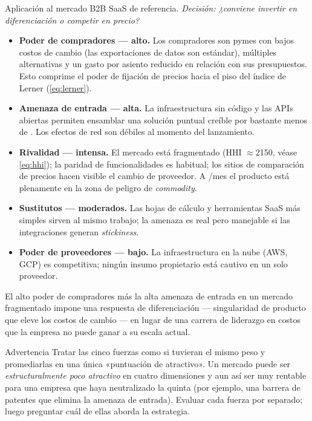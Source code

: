 \begin{example}
Aplicación al mercado B2B SaaS de referencia. \emph{Decisión: ¿conviene invertir en
diferenciación o competir en precio?}

\begin{itemize}
  \item \textbf{Poder de compradores --- alto.} Los compradores son pymes con bajos costos de
        cambio (las exportaciones de datos son estándar), múltiples alternativas y un gasto por
        asiento reducido en relación con sus presupuestos. Esto comprime el poder de fijación de
        precios hacia el piso del índice de Lerner (\cref{eq:lerner}).
  \item \textbf{Amenaza de entrada --- alta.} La infraestructura sin código y las APIs abiertas
        permiten ensamblar una solución puntual creíble por bastante menos de .
        Los efectos de red son débiles al momento del lanzamiento.
  \item \textbf{Rivalidad --- intensa.} El mercado está fragmentado (HHI $\approx$\num{2150},
        véase \cref{eq:hhi}); la paridad de funcionalidades es habitual; los sitios de comparación
        de precios hacen visible el cambio de proveedor. A /mes el producto está plenamente
        en la zona de peligro de \emph{commodity}.
  \item \textbf{Sustitutos --- moderados.} Las hojas de cálculo y herramientas SaaS más simples
        sirven al mismo trabajo; la amenaza es real pero manejable si las integraciones generan
        \emph{stickiness}.
  \item \textbf{Poder de proveedores --- bajo.} La infraestructura en la nube (AWS, GCP) es
        competitiva; ningún insumo propietario está cautivo en un solo proveedor.
\end{itemize}

El alto poder de compradores más la alta amenaza de entrada en un mercado fragmentado impone una
respuesta de diferenciación --- singularidad de producto que eleve los costos de cambio --- en
lugar de una carrera de liderazgo en costos que la empresa no puede ganar a su escala actual.
\end{example}

\begin{admonition}{Advertencia}
Tratar las cinco fuerzas como si tuvieran el mismo peso y promediarlas en una única
«puntuación de atractivo». Un mercado puede ser \emph{estructuralmente poco atractivo} en
cuatro dimensiones y aun así ser muy rentable para una empresa que haya neutralizado la quinta
(por ejemplo, una barrera de patentes que elimina la amenaza de entrada). Evaluar cada fuerza
por separado; luego preguntar cuál de ellas aborda la estrategia.
\end{admonition}

